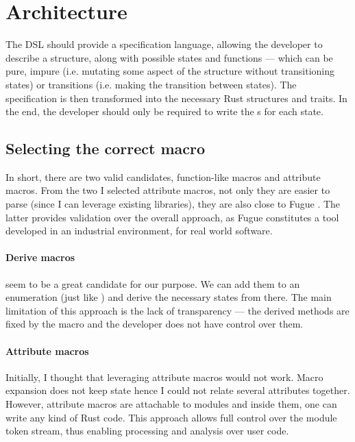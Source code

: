 \section{Architecture}\label{sec:arch}

The DSL should provide a specification language,
allowing the developer to describe a structure, along with possible states and functions ---
which can be pure, impure (i.e. mutating some aspect of the structure without transitioning states)
or transitions (i.e. making the transition between states).
The specification is then transformed into the necessary Rust structures and traits.
In the end, the developer should only be required to write the s for each state.

\subsection{Selecting the correct macro}

In short, there are two valid candidates, function-like macros and attribute macros.
From the two I selected attribute macros,
not only they are easier to parse (since I can leverage existing libraries),
they are also close to Fugue \autocite{DeLine2004}.
The latter provides validation over the overall approach, as Fugue constitutes a tool developed in an industrial environment, for real world software.

\paragraph{Derive macros} seem to be a great candidate for our purpose.
We can add them to an enumeration (just like \autocite{Fitzgerald2019}) and derive the necessary states from there.
The main limitation of this approach is the lack of transparency —
the derived methods are fixed by the macro and the developer does not have control over them.

\paragraph{Attribute macros} Initially, I thought that leveraging attribute macros would not work.
Macro expansion does not keep state hence I could not relate several attributes together.
However, attribute macros are attachable to modules and inside them, one can write any kind of Rust code.
This approach allows full control over the module token stream, thus enabling processing and analysis over user code.

